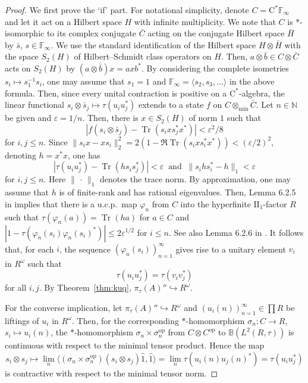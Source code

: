 \documentclass[12pt]{amsart}
\theoremstyle{definition}
\begin{document}
\begin{proof}
We first prove the `if' part. For notational simplicity,
denote $C=\mathrm{C^*}{{\mathbb F}}_\infty$ and let it act on a Hilbert space ${H}$
with infinite multiplicity.
We note that $C$ is $*$-isomorphic to its complex conjugate $\bar{C}$ acting
on the conjugate Hilbert space $\bar{H}$ by $\bar{s}$, $s\in{{\mathbb F}}_\infty$.
We use the standard identification of the Hilbert space ${H}\otimes\bar{H}$
with the space $S_2({H})$ of Hilbert--Schmidt class operators on ${H}$.
Then, $a\otimes\bar{b}\in C\otimes\bar{C}$ acts on $S_2({H})$ by $(a\otimes\bar{b})x=axb^*$.
By considering the complete isometries
$s_i\mapsto s_1^{-1}s_i$, one may assume that $s_1=1$
and ${{\mathbb F}}_\infty=\langle s_2,s_3,\ldots\rangle$ in the above formula.
Then, since every unital contraction is positive on a $\mathrm{C}^*$-algebra,
the linear functional $s_i\otimes\bar{s}_j\mapsto \tau(u_iu_j^*)$ extends to
a state $f$ on $C\otimes_{\min}\bar{C}$.
Let $n\in{{\mathbb N}}$ be given and ${\varepsilon}=1/n$.
Then, there is $x\in S_2({H})$ of norm $1$ such that
\[
|f(s_i\otimes\bar{s}_j) - \operatorname*{Tr}(s_ixs_j^*x^*)|<{\varepsilon}^2/8
\]
for $i,j\le n$. Since $\|s_ix - xs_i \|_2^2=2(1-\Re\operatorname*{Tr}(s_ixs_i^*x^*))<({\varepsilon}/2)^2$,
denoting $h=x^*x$, one has
\[
|\tau(u_iu_j^*) - \operatorname*{Tr}(h s_is_j^*)|<{\varepsilon}
\ \mbox{ and }\
\| s_ihs_i^* - h \|_1<{\varepsilon}
\]
for $i,j\le n$. Here $\|\,\cdot\,\|_1$ denotes the trace norm.
By approximation, one may assume that $h$ is of finite-rank and has rational eigenvalues.
Then, Lemma 6.2.5 in \cite{bo} implies that there is a u.c.p.\ map
${\varphi}_n$ from $C$ into the hyperfinite $\mathrm{II}_1$-factor $R$
such that $\tau({\varphi}_n(a))=\operatorname*{Tr}(ha)$ for $a\in C$ and
$|1 - \tau({\varphi}_n(s_i){\varphi}_n(s_i)^*)|\le 2{\varepsilon}^{1/2}$ for $i\le n$.
See also Lemma 6.2.6 in \cite{bo}.
It follows that, for each $i$, the sequence $({\varphi}_n(s_i))_{n=1}^\infty$ gives rise to
a unitary element $v_i$ in $R^\omega$ such that
\[
\tau(u_iu_j^*) = \tau(v_iv_j^*)
\]
for all $i,j$. By Theorem~\ref{thm:kuq}, $\pi_\tau(A)''\hookrightarrow R^\omega$.

For the converse implication, let $\pi_\tau(A)''\hookrightarrow R^\omega$
and $(u_i(n))_{n=1}^\infty\in\prod R$ be liftings of $u_i$ in $R^\omega$.
Then, for the corresponding {$*$-homo\-mor\-phism\xspace} $\sigma_n\colon C\to R$, $s_i\mapsto u_i(n)$,
the {$*$-homo\-mor\-phism\xspace} $\sigma_n\times\sigma_n^{\mathrm{op}}$ from $C\otimes C^{\mathrm{op}}$ to ${{\mathbb B}}(L^2(R,\tau))$
is continuous with respect to the minimal tensor product.
Hence the map
\[
s_i\otimes s_j\mapsto\lim_n{\mathopen{\langle}{(\sigma_n\times\sigma_n^{\mathrm{op}})(s_i\otimes s_j)\hat{1},\hat{1}}\mathclose{\rangle}}
=\lim_n\tau(u_i(n)u_j(n)^*)=\tau(u_iu_j^*)
\]
is contractive with respect to the minimal tensor norm.
\end{proof}
\end{document}

